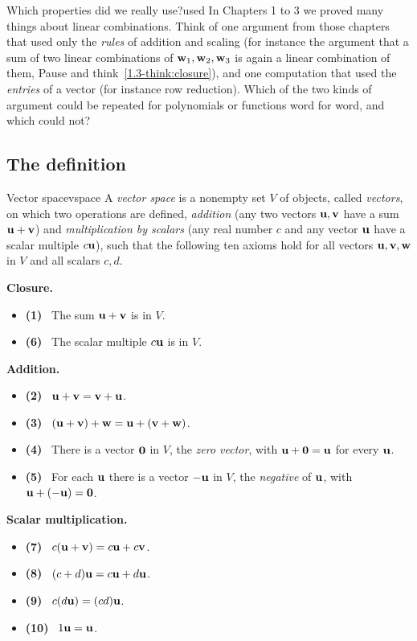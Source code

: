 \documentclass[11pt]{article}
\begin{document}
\begin{think}{Which properties did we really use?}{used}
In Chapters 1 to 3 we proved many things about linear combinations. Think of one argument from those chapters that used only the \emph{rules} of addition and scaling (for instance the argument that a sum of two linear combinations of $\mathbf{w}_1,\mathbf{w}_2,\mathbf{w}_3$ is again a linear combination of them, Pause and think~\ref{1.3-think:closure}), and one computation that used the \emph{entries} of a vector (for instance row reduction). Which of the two kinds of argument could be repeated for polynomials or functions word for word, and which could not?
\end{think}

\subsection*{The definition}

\begin{defn}{Vector space}{vspace}
A \emph{vector space} is a nonempty set $V$ of objects, called \emph{vectors}, on which two operations are defined, \emph{addition} (any two vectors $\mathbf{u},\mathbf{v}$ have a sum $\mathbf{u}+\mathbf{v}$) and \emph{multiplication by scalars} (any real number $c$ and any vector $\mathbf{u}$ have a scalar multiple $c\mathbf{u}$), such that the following ten axioms hold for all vectors $\mathbf{u},\mathbf{v},\mathbf{w}$ in $V$ and all scalars $c,d$.

\textbf{Closure.}
\begin{itemize}[label={},itemsep=1pt,leftmargin=1.5em]
  \item \textbf{(1)}~ The sum $\mathbf{u}+\mathbf{v}$ is in $V$.
  \item \textbf{(6)}~ The scalar multiple $c\mathbf{u}$ is in $V$.
\end{itemize}
\textbf{Addition.}
\begin{itemize}[label={},itemsep=1pt,leftmargin=1.5em]
  \item \textbf{(2)}~ $\mathbf{u}+\mathbf{v}=\mathbf{v}+\mathbf{u}$.
  \item \textbf{(3)}~ $(\mathbf{u}+\mathbf{v})+\mathbf{w}=\mathbf{u}+(\mathbf{v}+\mathbf{w})$.
  \item \textbf{(4)}~ There is a vector $\mathbf{0}$ in $V$, the \emph{zero vector}, with $\mathbf{u}+\mathbf{0}=\mathbf{u}$ for every $\mathbf{u}$.
  \item \textbf{(5)}~ For each $\mathbf{u}$ there is a vector $-\mathbf{u}$ in $V$, the \emph{negative} of $\mathbf{u}$, with $\mathbf{u}+(-\mathbf{u})=\mathbf{0}$.
\end{itemize}
\textbf{Scalar multiplication.}
\begin{itemize}[label={},itemsep=1pt,leftmargin=1.5em]
  \item \textbf{(7)}~ $c(\mathbf{u}+\mathbf{v})=c\mathbf{u}+c\mathbf{v}$.
  \item \textbf{(8)}~ $(c+d)\mathbf{u}=c\mathbf{u}+d\mathbf{u}$.
  \item \textbf{(9)}~ $c(d\mathbf{u})=(cd)\mathbf{u}$.
  \item \textbf{(10)}~ $1\mathbf{u}=\mathbf{u}$.
\end{itemize}
\end{defn}
\end{document}
